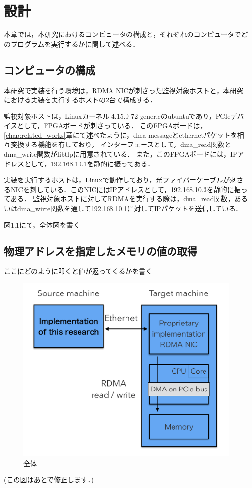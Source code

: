 \chapter{設計}
\label{chap:design}

本章では，本研究におけるコンピュータの構成と，それぞれのコンピュータでどのプログラムを実行するかに関して述べる．

\section{コンピュータの構成}

本研究で実装を行う環境は，RDMA NICが刺さった監視対象ホストと，本研究における実装を実行するホストの2台で構成する．

監視対象ホストは，Linuxカーネル 4.15.0-72-genericのubuntuであり，PCIeデバイスとして，FPGAボードが刺さっている．
このFPGAボードは，\ref{chap:related_works}章にて述べたように，dma messageとethernetパケットを相互変換する機能を有しており，
インターフェースとして，dma_read関数とdma_write関数がlibtlpに用意されている．
また，このFPGAボードには，IPアドレスとして，192.168.10.1を静的に振ってある．

実装を実行するホストは，Linuxで動作しており，光ファイバーケーブルが刺さるNICを刺している．このNICにはIPアドレスとして，192.168.10.3を静的に振ってある．
監視対象ホストに対してRDMAを実行する際は，dma_read関数，あるいはdma_wirte関数を通して192.168.10.1に対してIPパケットを送信している．

図\ref{fig:zentai}にて，全体図を書く

\section{物理アドレスを指定したメモリの値の取得}

ここにどのように叩くと値が返ってくるかを書く

\begin{figure}[htbp]
    \caption{全体}
    \label{fig:zentai}
    \begin{center}
        \includegraphics[bb=0 0 1000 530,width=15cm]{img/zentai.png}
    \end{center}
\end{figure}

(この図はあとで修正します．)
